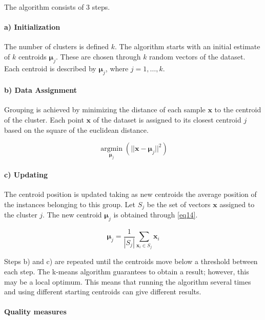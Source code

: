 \documentclass[conference]{IEEEtran}
\begin{document}
The algorithm consists of 3 steps.

\paragraph*{a) Initialization} 

The number of clusters is defined $k$. The algorithm starts with an initial estimate of $k$ centroids $\boldsymbol{\mu}_j$. These are chosen through $k$ random vectors of the dataset. Each centroid is described by $\boldsymbol{\mu}_j$, where $j = 1,\dots,k$.

\paragraph*{b) Data Assignment} 

Grouping is achieved by minimizing the distance of each sample $\boldsymbol{x}$ to the centroid of the cluster. Each point $\boldsymbol{x}$ of the dataset is assigned to its closest centroid $j$ based on the square of the euclidean distance. 

\begin{equation}
\label{eq13}
\operatorname*{argmin}_{\boldsymbol{\mu}_j} ( {||\boldsymbol{x}-\boldsymbol{\mu}_j||}^{2})
\end{equation}


\paragraph*{c) Updating} 

The centroid position is updated taking as new centroids the average position of the instances belonging to this group. Let $S_j$ be the set of vectors $\boldsymbol{x}$ assigned to the cluster $j$. The new centroid $\boldsymbol{\mu}_j$ is obtained through \eqref{eq14}.

\begin{equation}
\label{eq14}
\boldsymbol{\mu}_j = \frac{1}{|S_j|} \sum_{\boldsymbol{x}_i \in S_j} \boldsymbol{x}_i
\end{equation}

Steps b) and c) are repeated until the centroids move below a threshold between each step. 
The k-means algorithm guarantees to obtain a result; however, this may be a local optimum. This means that running the algorithm several times and using different starting centroids can give different results.

\paragraph{Quality measures}
\end{document}
